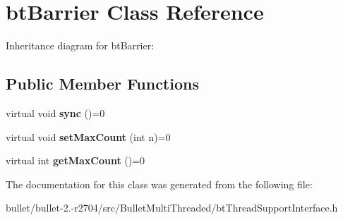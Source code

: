 \hypertarget{classbt_barrier}{\section{bt\+Barrier Class Reference}
\label{classbt_barrier}
}


Inheritance diagram for bt\+Barrier\+:
\subsection*{Public Member Functions}
\begin{DoxyCompactItemize}
\item 
\hypertarget{classbt_barrier_aaa871504a1b0efe6989efc3240c87564}{virtual void {\bfseries sync} ()=0}\label{classbt_barrier_aaa871504a1b0efe6989efc3240c87564}

\item 
\hypertarget{classbt_barrier_a30f8c5dfa5b1cc41342efcb368defe3a}{virtual void {\bfseries set\+Max\+Count} (int n)=0}\label{classbt_barrier_a30f8c5dfa5b1cc41342efcb368defe3a}

\item 
\hypertarget{classbt_barrier_ab34964db1b308486460d32456b719066}{virtual int {\bfseries get\+Max\+Count} ()=0}\label{classbt_barrier_ab34964db1b308486460d32456b719066}

\end{DoxyCompactItemize}


The documentation for this class was generated from the following file\+:\begin{DoxyCompactItemize}
\item 
bullet/bullet-\/2.-\/r2704/src/\+Bullet\+Multi\+Threaded/bt\+Thread\+Support\+Interface.\+h\end{DoxyCompactItemize}
